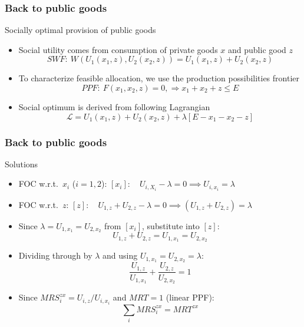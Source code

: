 \documentclass[aspectratio=169]{beamer}
\begin{document}
\begin{frame}
\frametitle{Back to public goods} 
Socially optimal provision of public goods
\begin{itemize}\setlength\itemsep{3pt}
\item Social utility comes from consumption of private goods $x$ and public good $z$
\[SWF:\ W(U_1(x_1,z), U_2(x_2,z)) = U_1(x_1,z)+U_2(x_2,z)
\]
\item To characterize feasible allocation, we use the production possibilities frontier
 \[
 PPF: \ F(x_1,x_2,z)=0, \Rightarrow x_1+x_2+z \leq E
 \]
 \item Social optimum is derived from following Lagrangian
\[
\mathcal{L}=U_1(x_1,z)+ U_2(x_2,z) +\lambda [E-x_1-x_2-z]
\]

\end{itemize}
\end{frame}

\begin{frame}
\frametitle{Back to public goods} 
Solutions
\begin{itemize}\setlength\itemsep{3pt}
    \item FOC w.r.t.\ $x_i$ ($i=1,2$): $[x_i]: \quad  U_{i,X_i} - \lambda  = 0 \implies U_{i,x_i}=\lambda $
    
    \item FOC w.r.t.\ $z$: $[z]: \quad  U_{1,z} + U_{2,z} -\lambda  = 0\implies (U_{1,z} + U_{2,z}) = \lambda$
    \item Since $\lambda = U_{1,x_1} = U_{2,x_2}$
    from $[x_i]$, substitute into $[z]$:
    \[
    U_{1,z} + U_{2,z} = U_{1,x_1} = U_{2,x_2}
    \]
    \item Dividing through by $\lambda$ and using
    $U_{1,x_1} = U_{2,x_2} = \lambda$:
    \[
    \frac{U_{1,z}}{U_{1,x_1}} +
    \frac{U_{2,z}}{U_{2,x_2}} = 1
    \]
    \item Since $MRS_i^{zx} = U_{i,z}/U_{i,x_i}$
    and $MRT = 1$ (linear PPF):
    \[
    \boxed{\sum_i MRS_i^{zx} = MRT^{zx}}
    \]
\end{itemize}
\end{frame}
\end{document}
